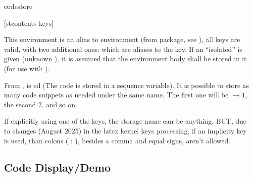 \documentclass{article}
\begin{document}
\begin{codedescribe}[env]{codestore}
	\begin{codesyntax}
		\tsmacro{\begin{codestore}}[stcontents-keys]{}
    \tsmacro{\end{codestore}}{}
	\end{codesyntax}
This environment is an alias to  environment (from  package, see \cite{SCONTENTS}), all  keys are valid, with two additional ones:  which are aliases to the  key. If an ``isolated''  is given (unknown ), it is assumed that the environment body shall be stored in it (for use with \tsobj[code]{\tscode,\tsmergedcode,\tsdemo,\tsresult,\tsexec}).
\end{codedescribe}
\begin{tsremark}
  From ,  is ed (The code is stored in a sequence variable). It is possible to store as many code snippets as needed under the same name. The first one will be $\rightarrow 1$, the second $2$, and so on.
\end{tsremark}
\begin{tsremark}
  If explicitly using one of the  keys, the storage name can be anything. BUT, due to changes (August 2025) in the latex kernel keys processing, if an implicity key is used,  than colons ( : ), besides a comma and equal signs, aren't allowed.
\end{tsremark}




\subsection{Code Display/Demo}\label{codelist}
\end{document}
